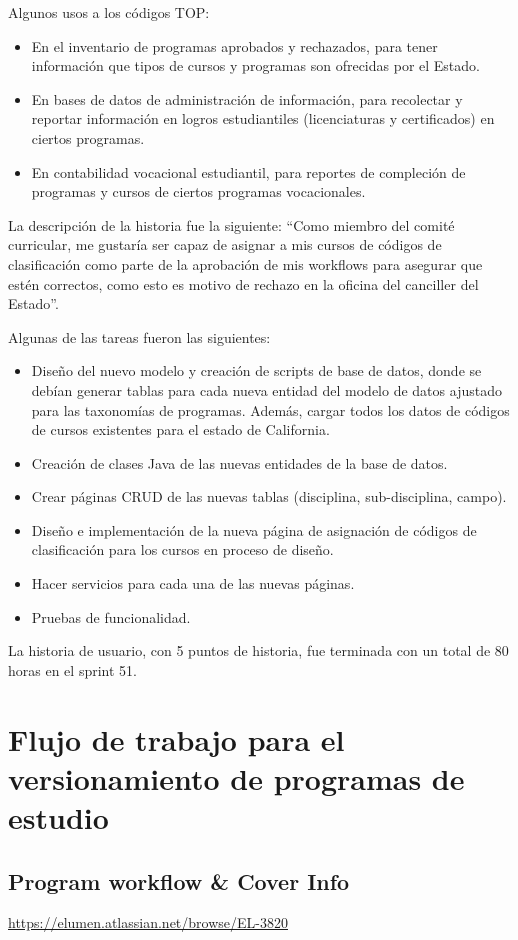 Algunos usos a los códigos TOP:
\begin{itemize}
	\item En el inventario de programas aprobados y rechazados, para tener información que tipos de cursos y programas son ofrecidas por el Estado.
	\item En bases de datos de administración de información, para recolectar y reportar información en logros estudiantiles (licenciaturas y certificados) en ciertos programas.
	\item En contabilidad vocacional estudiantil, para reportes de compleción de programas y cursos de ciertos programas vocacionales.
\end{itemize}

La descripción de la historia fue la siguiente: “Como miembro del comité curricular, me gustaría ser capaz de asignar a mis cursos de códigos de clasificación como parte de la aprobación de mis workflows para asegurar que estén correctos, como esto es motivo de rechazo en la oficina del canciller del Estado”.

Algunas de las tareas fueron las siguientes:
\begin{itemize}
	\item Diseño del nuevo modelo y creación de scripts de base de datos, donde se debían generar tablas para cada nueva entidad del modelo de datos ajustado para las taxonomías de programas. Además, cargar todos los datos de códigos de cursos existentes para el estado de California.
	\item Creación de clases Java de las nuevas entidades de la base de datos.
	\item Crear páginas CRUD de las nuevas tablas (disciplina, sub-disciplina, campo).
	\item Diseño e implementación de la nueva página de asignación de códigos de clasificación para los cursos en proceso de diseño.
	\item Hacer servicios para cada una de las nuevas páginas.
	\item Pruebas de funcionalidad.
\end{itemize}

La historia de usuario, con 5 puntos de historia, fue terminada con un total de 80 horas en el sprint 51.


\section{Flujo de trabajo para el versionamiento de programas de estudio}
\subsection{Program workflow \& Cover Info}
\url{https://elumen.atlassian.net/browse/EL-3820}

